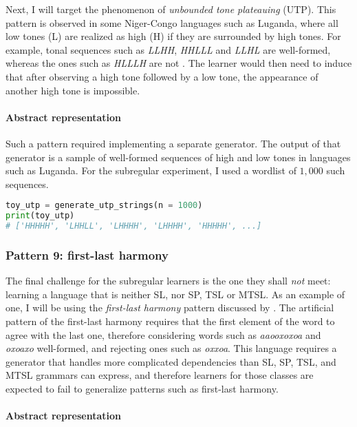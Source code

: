 Next, I will target the phenomenon of \emph{unbounded tone plateauing} (UTP).
This pattern is observed in some Niger-Congo languages such as Luganda, where all low tones (L) are realized as high (H) if they are surrounded by high tones.
For example, tonal sequences such as \emph{LLHH}, \emph{HHLLL} and \emph{LLHL} are well-formed, whereas the ones such as \emph{HLLLH} are not \citep{Hyman2011,Jardine2016}.
The learner would then need to induce that after observing a high tone followed by a low tone, the appearance of another high tone is impossible.

\paragraph{Abstract representation}

Such a pattern required implementing a separate generator.
The output of that generator is a sample of well-formed sequences of high and low tones in languages such as Luganda.
For the subregular experiment, I used a wordlist of $1,000$ such sequences.

\begin{lstlisting}[language=Python]
toy_utp = generate_utp_strings(n = 1000)
print(toy_utp)
# ['HHHHH', 'LHHLL', 'LHHHH', 'LHHHH', 'HHHHH', ...]
\end{lstlisting}


\subsubsection{Pattern 9: first-last harmony}

The final challenge for the subregular learners is the one they shall \emph{not} meet: learning a language that is neither SL, nor SP, TSL or MTSL.
As an example of one, I will be using the \emph{first-last harmony} pattern discussed by \cite{Lai15}.
The artificial pattern of the first-last harmony requires that the first element of the word to agree with the last one, therefore considering words such as \emph{aaooxoxoa} and \emph{oxoaxo} well-formed, and rejecting ones such as \emph{oxxoa}.
This language requires a generator that handles more complicated dependencies than SL, SP, TSL, and MTSL grammars can express, and therefore learners for those classes are expected to fail to generalize patterns such as first-last harmony.

\paragraph{Abstract representation}

